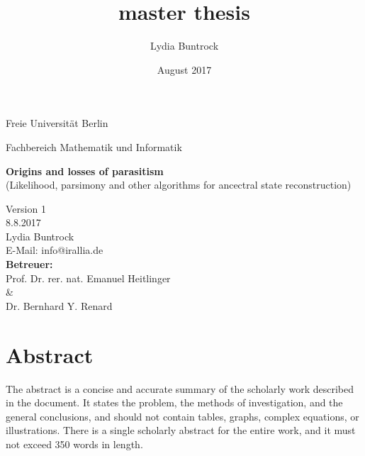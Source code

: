 
\author{Lydia Buntrock}
\title{master thesis}
\date{August 2017}


  \begin{titlepage}
    \pagestyle{empty}
  	\begin{center}
      {\Large Freie Universität Berlin}\\
    	\begin{Huge}
      	Fachbereich Mathematik und Informatik\\
      	\vspace{3mm}
    	\end{Huge}
    	\vspace{20mm}
    	\begin{Large}
    	    \textbf{Origins and losses of parasitism}\\
          (Likelihood, parsimony and other algorithms for ancectral state reconstruction)\\
    	\end{Large}
    	\vspace{8mm}
      Version 1\\
      8.8.2017\\
    	\vspace{2cm}
    	Lydia Buntrock \\
      E-Mail: info@irallia.de\\
     	\vspace{5cm}
    	\textbf{Betreuer:}\\
      Prof. Dr. rer. nat. Emanuel Heitlinger\\
      \& \\
      Dr. Bernhard Y. Renard\\
  	\end{center}
  	\clearpage
  \end{titlepage}

\chapter*{Abstract}
  The abstract is a concise and accurate summary of the scholarly work described in the document. It 
  states the problem, the methods of investigation, and the general conclusions, and should not 
  contain tables, graphs, complex equations, or illustrations. There is a single scholarly abstract 
  for the entire work, and it must not exceed 350 words in length.

